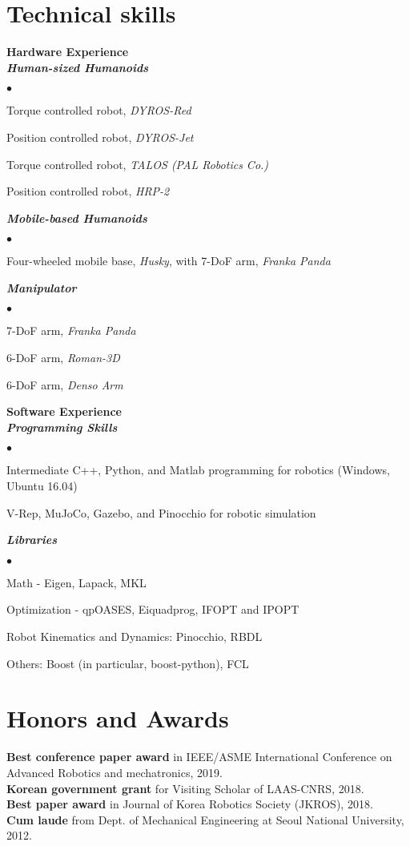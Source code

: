 \documentclass[margin,line]{res}
\newenvironment{list2}{
  \begin{list}{$\bullet$}{%
      \setlength{\itemsep}{0in}
      \setlength{\parsep}{0in} \setlength{\parskip}{0in}
      \setlength{\topsep}{0in} \setlength{\partopsep}{0in} 
      \setlength{\leftmargin}{0.2in}}}{\end{list}}
\begin{document}
\begin{resume}
\section{\sc Technical skills}
{\bf Hardware  Experience} \\
\textbf{\emph { Human-sized Humanoids}}
\begin{list2}
\item Torque controlled robot, \textit{DYROS-Red}
\item Position controlled robot, \textit{DYROS-Jet}
\item Torque controlled robot, \textit{TALOS (PAL Robotics Co.)}
\item Position controlled robot, \textit{HRP-2}
\end{list2}
\vspace{-0.3cm}
\textbf{\emph { Mobile-based Humanoids}}
\begin{list2}
\item Four-wheeled mobile base, \textit{Husky}, with 7-DoF arm, \textit{Franka Panda}
\end{list2}
\vspace{-0.3cm}
\textbf{\emph { Manipulator}}
\begin{list2}
\item 7-DoF arm, \textit{Franka Panda}
\item 6-DoF arm, \textit{Roman-3D}
\item 6-DoF arm, \textit{Denso Arm}
\end{list2}
{\bf Software Experience} \\
\textbf{\emph { Programming Skills}}
\begin{list2}
\item Intermediate C++, Python, and Matlab programming for robotics (Windows, Ubuntu 16.04)
\item V-Rep, MuJoCo, Gazebo, and Pinocchio for robotic simulation
\end{list2}
\vspace{-0.3cm}
\textbf{\emph { Libraries}}
\begin{list2}
\item Math - Eigen, Lapack, MKL
\item Optimization - qpOASES, Eiquadprog, IFOPT and IPOPT
\item Robot Kinematics and Dynamics: Pinocchio, RBDL
\item Others: Boost (in particular, boost-python), FCL
\end{list2}

\section{\sc Honors and Awards} 
\textbf{Best conference paper award} in IEEE/ASME International Conference on Advanced Robotics and mechatronics, 2019.\\
\textbf{Korean government grant} for Visiting Scholar of LAAS-CNRS, 2018. \\
\textbf{Best paper award} in Journal of Korea Robotics Society (JKROS), 2018.\\
\textbf{Cum laude} from Dept. of Mechanical Engineering at Seoul National University, 2012. 



\end{resume}
\end{document}
